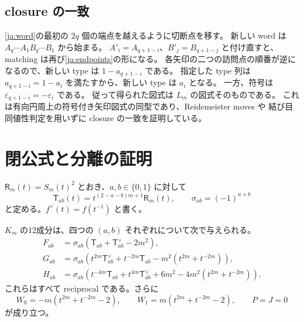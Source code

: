\documentclass[12pt]{amsart}
\theoremstyle{definition}
\theoremstyle{remark}
\numberwithin{equation}{section}
\newcommand{\eps}{\varepsilon}
\newcommand{\RR}{\mathsf R}
\newcommand{\TT}{\mathsf T}
\begin{document}
\subsection{closure の一致}
\eqref{ja:word}の最初の $2q$ 個の端点を越えるように切断点を移す。
新しい word は $A_q\cdots A_1 B_q\cdots B_1$ から始まる。
$A'_i=A_{q+1-i}$、$B'_j=B_{q+1-j}$ と付け直すと、
matching は再び\eqref{ja:endpoints}の形になる。
各矢印の二つの訪問点の順番が逆になるので、新しい type は $1-a_{q+1-i}$ である。
指定した type 列は $a_{q+1-i}=1-a_i$ を満たすから、新しい type は $a_i$ となる。
一方、符号は $\eps_{q+1-i}=-\eps_i$ である。
従って得られた図式は $L_m$ の図式そのものである。
これは有向円周上の符号付き矢印図式の同型であり、Reidemeister moves や
結び目同値性判定を用いずに closure の一致を証明している。

\section{閉公式と分離の証明}
$\RR_m(t)=S_m(t)^2$ とおき、$a,b\in\{0,1\}$ に対して
\[
\TT_{ab}(t)=t^{(2-a-b)m+1}\RR_m(t),\qquad \sigma_{ab}=(-1)^{a+b}
\]
と定める。$f^\vee(t)=f(t^{-1})$ と書く。
\begin{jthm}[全12個の閉公式]\label{ja:closed}
$K_m$ の12成分は、四つの $(a,b)$ それぞれについて次で与えられる。
\begin{align}
F_{ab}&=\sigma_{ab}(\TT_{ab}+\TT_{ab}^\vee-2m^2),\label{ja:closedF}\\
G_{ab}&=\sigma_{ab}(t^{2m}\TT_{ab}^\vee+t^{-2m}\TT_{ab}
-m^2(t^{2m}+t^{-2m})),\label{ja:closedG}\\
H_{ab}&=\sigma_{ab}(t^{-4m}\TT_{ab}+t^{4m}\TT_{ab}^\vee
+6m^2-4m^2(t^{2m}+t^{-2m})).\label{ja:closedH}
\end{align}
これらはすべて reciprocal である。さらに
\begin{equation}\label{ja:familyW}
W_0=-m(t^{2m}+t^{-2m}-2),\qquad
W_1=m(t^{2m}+t^{-2m}-2),\qquad P=J=0
\end{equation}
が成り立つ。
\end{jthm}
\end{document}
